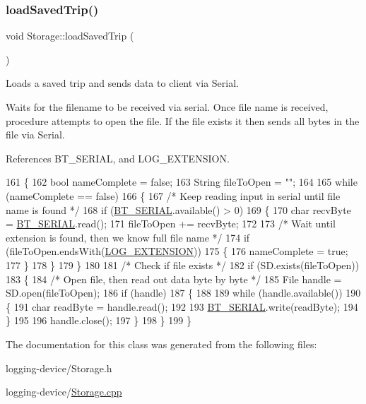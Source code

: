 \subsubsection{\texorpdfstring{load\+Saved\+Trip()}{loadSavedTrip()}}
{\footnotesize\ttfamily void Storage\+::load\+Saved\+Trip (\begin{DoxyParamCaption}{ }\end{DoxyParamCaption})}



Loads a saved trip and sends data to client via Serial. 

Waits for the filename to be received via serial. Once file name is received, procedure attempts to open the file. If the file exists it then sends all bytes in the file via Serial. 

References B\+T\+\_\+\+S\+E\+R\+I\+AL, and L\+O\+G\+\_\+\+E\+X\+T\+E\+N\+S\+I\+ON.


\begin{DoxyCode}
161 \{
162   \textcolor{keywordtype}{bool} nameComplete = \textcolor{keyword}{false};
163   String fileToOpen = \textcolor{stringliteral}{""};
164 
165   \textcolor{keywordflow}{while} (nameComplete == \textcolor{keyword}{false})
166   \{
167     \textcolor{comment}{/* Keep reading input in serial until file name is found */}
168     \textcolor{keywordflow}{if} (\hyperlink{_storage_8cpp_ad1e6e6f6fc813b305067b9e1b0777ea6}{BT\_SERIAL}.available() > 0)
169     \{
170       \textcolor{keywordtype}{char} recvByte = \hyperlink{_storage_8cpp_ad1e6e6f6fc813b305067b9e1b0777ea6}{BT\_SERIAL}.read();
171       fileToOpen += recvByte;
172 
173       \textcolor{comment}{/* Wait until extension is found, then we know full file name */}
174       \textcolor{keywordflow}{if} (fileToOpen.endsWith(\hyperlink{_storage_8cpp_a907e440e32d31fd828188004703e3178}{LOG\_EXTENSION}))
175       \{
176         nameComplete = \textcolor{keyword}{true};
177       \}
178     \}
179   \}
180 
181   \textcolor{comment}{/* Check if file exists */}
182   \textcolor{keywordflow}{if} (SD.exists(fileToOpen))
183   \{
184     \textcolor{comment}{/* Open file, then read out data byte by byte */}
185     File handle = SD.open(fileToOpen);
186     \textcolor{keywordflow}{if} (handle)
187     \{
188 
189       \textcolor{keywordflow}{while} (handle.available())
190       \{
191         \textcolor{keywordtype}{char} readByte = handle.read();
192 
193         \hyperlink{_storage_8cpp_ad1e6e6f6fc813b305067b9e1b0777ea6}{BT\_SERIAL}.write(readByte);
194       \}
195 
196       handle.close();
197     \}
198   \}
199 \}
\end{DoxyCode}


The documentation for this class was generated from the following files\+:\begin{DoxyCompactItemize}
\item 
logging-\/device/Storage.\+h\item 
logging-\/device/\hyperlink{_storage_8cpp}{Storage.\+cpp}\end{DoxyCompactItemize}
